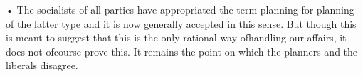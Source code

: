 \documentclass[11pt,openany]{book}
\begin{document}
• The socialists of all parties have appropriated the term planning for planning of the latter type and it is now generally accepted in this sense. But though this is meant to suggest that this is the only rational way ofhandling our affairs, it does not ofcourse prove this. It remains the point on which the planners and the liberals disagree.

\begin{center}\textasteriskcentered\hspace{0.9em}\textasteriskcentered\hspace{0.9em}\textasteriskcentered\end{center}

\begin{center}\textasteriskcentered\hspace{0.9em}\textasteriskcentered\hspace{0.9em}\textasteriskcentered\end{center}

\begin{center}\textasteriskcentered\hspace{0.9em}\textasteriskcentered\hspace{0.9em}\textasteriskcentered\end{center}

\begin{center}\textasteriskcentered\hspace{0.9em}\textasteriskcentered\hspace{0.9em}\textasteriskcentered\end{center}

\begin{center}\textasteriskcentered\hspace{0.9em}\textasteriskcentered\hspace{0.9em}\textasteriskcentered\end{center}
\end{document}
